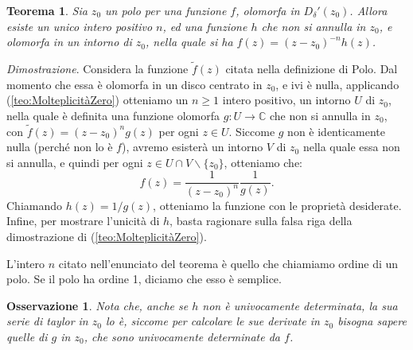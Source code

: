 \documentclass[11pt]{book}
\makeatletter
\theoremstyle{Definizione}
\theoremstyle{TeoremaProposizioneLemmaCorollarioCongettura}
\newtheorem{myteo}{Teorema}[section]
\theoremstyle{OsservazioneNotaEsempio}
\newtheorem{myobs}{Osservazione}[section]
\renewenvironment{proof}[1][\proofname]{\par
  \normalfont \topsep6\p@\@plus6\p@\relax
  \trivlist
  \item[\hskip\labelsep
        \itshape
    #1\@addpunct{.}]\ignorespaces
}{%
  \endtrivlist\@endpefalse
}
\renewenvironment{proof}{\textsl{Dimostrazione}.}{}
\newcommand{\C}{\mathbb{C}}
\newcommand{\DiscPunt}[2]{D_{#1}'({#2})}
\newcommand{\tolto}{\smallsetminus}
\makeatother
\begin{document}
\begin{boxteo}{}
\begin{myteo}\label{teo:OrdinePolo}
Sia $z_0$ un polo per una funzione $f$, olomorfa in $\DiscPunt{\delta}{z_0}$. Allora esiste un unico intero positivo $n$, ed una funzione $h$ che non si annulla in $z_0$, e olomorfa in un intorno di $z_0$, nella quale si ha $f(z) = (z-z_0)^{-n}h(z)$.
\end{myteo}
\tcblower
\begin{proof}
Considera la funzione $\widetilde{f}(z)$ citata nella definizione di Polo. Dal momento che essa è olomorfa in un disco centrato in $z_0$, e ivi è nulla, applicando (\ref{teo:MolteplicitàZero}) otteniamo un $n \geq 1$ intero positivo, un intorno $U$ di $z_0$, nella quale è definita una funzione olomorfa $g:U \longrightarrow \C$ che non si annulla in $z_0$, con $\widetilde{f}(z) = (z-z_0)^n g(z)$ per ogni $z\in U$. Siccome $g$ non è identicamente nulla (perché non lo è $f$), avremo esisterà un intorno $V$ di $z_0$ nella quale essa non si annulla, e quindi per ogni $z\in U\cap V \tolto \{z_0\}$, otteniamo che:
$$
f(z) = \frac{1}{(z-z_0)^n}\frac{1}{g(z)}.
$$
Chiamando $h(z) = 1/g(z)$, otteniamo la funzione con le proprietà desiderate. Infine, per mostrare l'unicità di $h$, basta ragionare sulla falsa riga della dimostrazione di (\ref{teo:MolteplicitàZero}).
\end{proof}
\end{boxteo}
\noindent
L'intero $n$ citato nell'enunciato del teorema è quello che chiamiamo ordine di un polo. Se il polo ha ordine 1, diciamo che esso è semplice.
\begin{myobs}
Nota che, anche se $h$ non è univocamente determinata, la sua serie di taylor in $z_0$ lo è, siccome per calcolare le sue derivate in $z_0$ bisogna sapere quelle di $g$ in $z_0$, che sono univocamente determinate da $f$.
\end{myobs}
\end{document}
